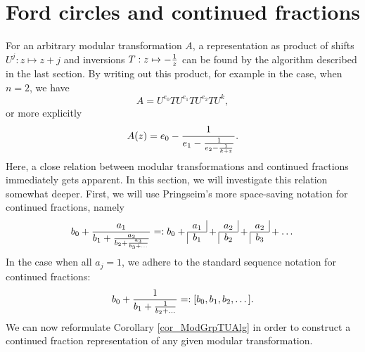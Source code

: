 \section{Ford circles and continued fractions}

For an arbitrary modular transformation $A$, a representation as product of shifts $U^j: z \mapsto z+j$ and inversions $T: z \mapsto -\frac{1}{z}$ can be found by the algorithm described in the last section. By writing out this product, for example in the case, when $n=2$, we have
\begin{equation*}
A = U^{e_0}T U^{e_1}T U^{e_2}T U^k,
\end{equation*}
or more explicitly
\begin{equation*}
A(z) = e_0 - \frac{1}{e_1 - \frac{1}{e_2 - \frac{1}{k + z}}}.
\end{equation*}
Here, a close relation between modular transformations and continued fractions immediately gets apparent. In this section, we will investigate this relation somewhat deeper. 
First, we will use Pringseim's more space-saving notation for continued fractions, namely
\begin{equation}
\label{eqn_ConFracNotation}
b_0 + \frac{a_1}{b_1 + \frac{a_2}{b_2 + \frac{a_3}{b_3 + \dots}}} =: 
b_0 + \cfr{a_1}{b_1} + \cfr{a_2}{b_2} + \cfr{a_2}{b_3} + \dots
\end{equation}
In the case when all $a_j = 1$, we adhere to the standard sequence notation for continued fractions:
\begin{equation*}
b_0 + \frac{1}{b_1 + \frac{1}{b_2 + \dots}} =: [b_0,b_1,b_2,\dots].
\end{equation*}
We can now reformulate Corollary \ref{cor_ModGrpTUAlg} in order to construct a continued fraction representation of any given modular transformation.


